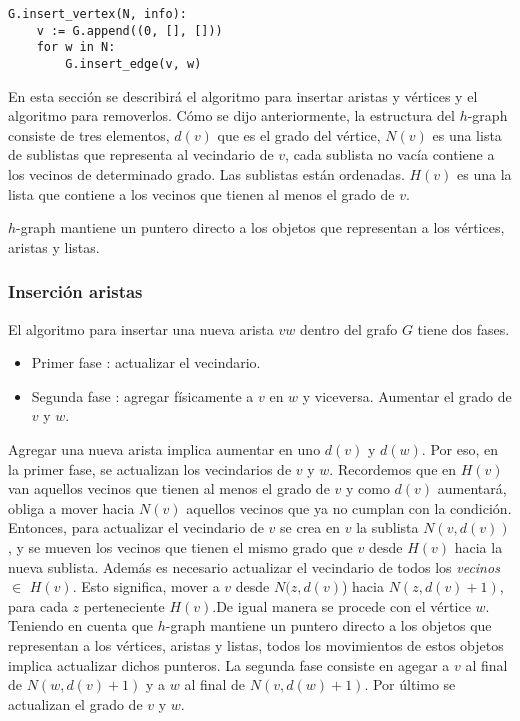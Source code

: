 \documentclass[a4paper,12pt]{article}
\begin{document}
\begin{lstlisting}
G.insert_vertex(N, info):
    v := G.append((0, [], []))
    for w in N:
        G.insert_edge(v, w)
\end{lstlisting}


En esta sección se describirá el algoritmo para insertar aristas y vértices y el algoritmo para removerlos.
Cómo se dijo anteriormente, la estructura del $h$-graph consiste de tres elementos, $d(v)$ que es el grado del vértice, $N(v)$ es una lista de sublistas que representa al vecindario de $v$, cada sublista no vacía contiene a los vecinos de determinado grado. Las sublistas están ordenadas. $H(v)$ es una la lista que contiene a los vecinos que tienen al menos el grado de $v$.

$h$-graph mantiene un puntero directo a los objetos que representan a los vértices, aristas y listas.



\subsubsection{Inserción aristas}

El algoritmo para insertar una nueva arista $vw$ dentro del grafo $G$ tiene dos fases.
\begin{itemize}
\item Primer fase : actualizar el vecindario.
\item Segunda fase : agregar físicamente a $v$ en $w$ y viceversa. Aumentar el grado de $v$ y $w$.
\end{itemize}

Agregar una nueva arista implica aumentar en uno $d(v)$ y $d(w)$. Por eso, en la primer fase, se actualizan los vecindarios de $v$ y $w$. Recordemos que en $H(v)$ van aquellos vecinos que tienen al menos el grado de $v$ y como $d(v)$ aumentará, obliga a mover hacia $N(v)$ aquellos vecinos que ya no cumplan con la condición. Entonces, para actualizar el vecindario de $v$ se crea en $v$ la sublista $N(v, d(v))$, y se mueven los vecinos que tienen el mismo grado que $v$ desde $H(v)$ hacia la nueva sublista.
Además es necesario actualizar el vecindario de todos los \emph{vecinos} $\in$ $H(v)$. Esto significa, mover a $v$ desde $N(z,d(v)$) hacia $N(z, d(v)+1)$, para cada $z$  perteneciente $H(v)$.De igual manera se procede con el vértice $w$.
Teniendo en cuenta que $h$-graph mantiene un puntero directo a los objetos que representan a los vértices, aristas y listas, todos los movimientos de estos objetos implica actualizar dichos punteros.
La segunda fase consiste en agegar a $v$ al final de $N(w,d(v)+1)$ y a $w$ al final de $N(v,d(w)+1)$. Por último se actualizan el grado de $v$ y $w$.
\end{document}
